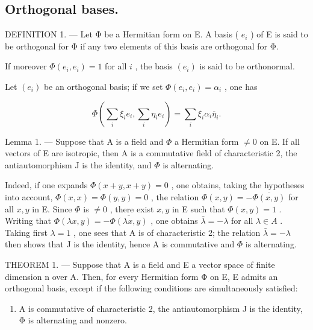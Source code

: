 \subsection{Orthogonal bases.}

DEFINITION 1. --- Let Φ be a Hermitian form on E. A basis ( \(e_{i}\) ) of E is said to be orthogonal for Φ if any two elements of this basis are orthogonal for Φ.

If moreover \(\Phi(e_i, e_i) = 1\) for all \(i\) , the basis \((e_i)\) is said to be orthonormal.

Let \((e_i)\) be an orthogonal basis; if we set \(\Phi(e_i, e_i) = \alpha_i\) , one has

\[
\Phi (\sum_ {i} \xi_ {i} e _ {i}, \sum_ {i} \eta_ {i} e _ {i}) = \sum_ {i} \xi_ {i} \alpha_ {i} \overline {{\eta}} _ {i}.\tag{1}
\]

Lemma 1. --- Suppose that A is a field and \(\Phi\) a Hermitian form \(\neq 0\) on E. If all vectors of E are isotropic, then A is a commutative field of characteristic 2, the antiautomorphism J is the identity, and \(\Phi\) is alternating.

Indeed, if one expands \(\Phi(x+y, x+y)=0\) , one obtains, taking the hypotheses into account, \(\Phi(x,x)=\Phi(y,y)=0\) , the relation \(\Phi(x,y)=-\overline{\Phi(x,y)}\) for all \(x,y\) in E. Since \(\Phi\) is \(\neq 0\) , there exist \(x,y\) in E such that \(\Phi(x,y)=1\) . Writing that \(\Phi(\lambda x,y)=-\overline{\Phi(\lambda x,y)}\) , one obtains \(\bar{\lambda}=-\lambda\) for all \(\lambda\in A\) . Taking first \(\lambda=1\) , one sees that A is of characteristic 2; the relation \(\bar{\lambda}=-\lambda\) then shows that J is the identity, hence A is commutative and \(\Phi\) is alternating.

THEOREM 1. --- Suppose that A is a field and E a vector space of finite dimension n over A. Then, for every Hermitian form Φ on E, E admits an orthogonal basis, except if the following conditions are simultaneously satisfied:

\begin{enumerate}
\def\labelenumi{(\Alph{enumi})}
\setcounter{enumi}{2}
\tightlist
\item
  A is commutative of characteristic 2, the antiautomorphism J is the identity, Φ is alternating and nonzero.
\end{enumerate}

